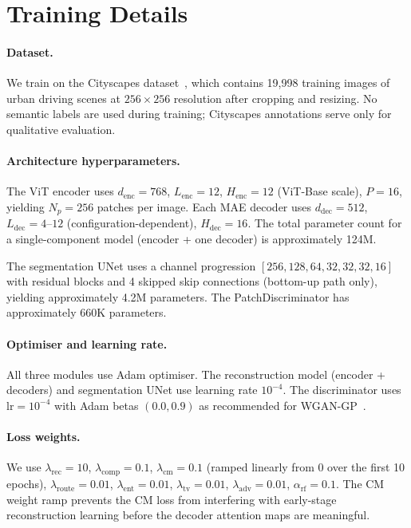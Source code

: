 \documentclass{article}
\begin{document}
\section{Training Details}
\label{sec:training}

\paragraph{Dataset.}
We train on the Cityscapes dataset~\cite{cordts2016cityscapes}, which contains
19,998 training images of urban driving scenes at $256 \times 256$ resolution
after cropping and resizing.  No semantic labels are used during training;
Cityscapes annotations serve only for qualitative evaluation.

\paragraph{Architecture hyperparameters.}
The ViT encoder uses $d_\mathrm{enc}\!=\!768$, $L_\mathrm{enc}\!=\!12$,
$H_\mathrm{enc}\!=\!12$ (ViT-Base scale), $P\!=\!16$, yielding $N_p\!=\!256$ patches
per image.  Each MAE decoder uses $d_\mathrm{dec}\!=\!512$, $L_\mathrm{dec}\!=\!4$--$12$
(configuration-dependent), $H_\mathrm{dec}\!=\!16$.  The total parameter count
for a single-component model (encoder + one decoder) is approximately 124M.

The segmentation UNet uses a channel progression
$[256, 128, 64, 32, 32, 32, 16]$ with residual blocks and 4 skipped skip
connections (bottom-up path only), yielding approximately 4.2M parameters.
The PatchDiscriminator has approximately 660K parameters.

\paragraph{Optimiser and learning rate.}
All three modules use Adam optimiser.  The reconstruction model (encoder + decoders)
and segmentation UNet use learning rate $10^{-4}$.  The discriminator uses
$\text{lr}\!=\!10^{-4}$ with Adam betas $(0.0, 0.9)$ as recommended for
WGAN-GP~\cite{gulrajani2017improved}.

\paragraph{Loss weights.}
We use $\lambda_\mathrm{rec}\!=\!10$, $\lambda_\mathrm{comp}\!=\!0.1$,
$\lambda_\mathrm{cm}\!=\!0.1$ (ramped linearly from 0 over the first 10 epochs),
$\lambda_\mathrm{route}\!=\!0.01$, $\lambda_\mathrm{ent}\!=\!0.01$,
$\lambda_\mathrm{tv}\!=\!0.01$, $\lambda_\mathrm{adv}\!=\!0.01$,
$\alpha_\mathrm{rf}\!=\!0.1$.  The CM weight ramp prevents the CM loss from
interfering with early-stage reconstruction learning before the decoder
attention maps are meaningful.
\end{document}
